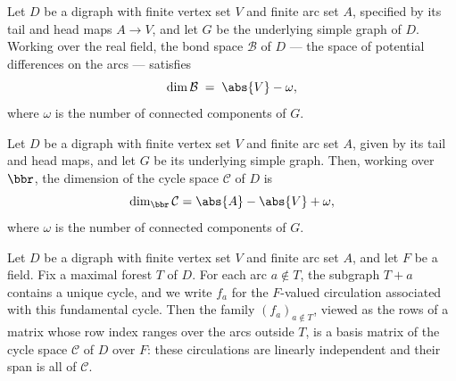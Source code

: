 \begin{theorem}
\label{CycleSpace.finrank_bondSpace}
\leanok
{}
Let $D$ be a digraph with finite vertex set $V$ and finite arc set $A$, specified by its
tail and head maps $A \to V$, and let $G$ be the underlying simple graph of $D$. Working
over the real field, the bond space $\mathcal{B}$ of $D$ — the space of potential
differences on the arcs — satisfies
\[
\dim \mathcal{B} \;=\; \abs{V} - \omega,
\]
where $\omega$ is the number of connected components of $G$.
\end{theorem}

\begin{theorem}
\label{CycleSpace.finrank_cycleSpace}
\leanok
{}
Let $D$ be a digraph with finite vertex set $V$ and finite arc set $A$, given by its
tail and head maps, and let $G$ be its underlying simple graph. Then, working over
$\bbr$, the dimension of the cycle space $\mathcal{C}$ of $D$ is
\[
\dim_{\bbr}\mathcal{C} = \abs{A} - \abs{V} + \omega,
\]
where $\omega$ is the number of connected components of $G$.
\end{theorem}

\begin{theorem}
\label{CycleSpace.isBasisMatrix_cycleSpace_of_maximalForest}
Let $D$ be a digraph with finite vertex set $V$ and finite arc set $A$, and let $F$ be a
field. Fix a maximal forest $T$ of $D$. For each arc $a \notin T$, the subgraph $T + a$
contains a unique cycle, and we write $f_a$ for the $F$-valued circulation associated
with this fundamental cycle. Then the family $(f_a)_{a \notin T}$, viewed as the rows of
a matrix whose row index ranges over the arcs outside $T$, is a basis matrix of the
cycle space $\mathcal{C}$ of $D$ over $F$: these circulations are linearly independent
and their span is all of $\mathcal{C}$.
\end{theorem}

